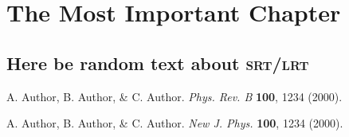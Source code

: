\documentclass[b5paper,twoside,openright]{scrbook}
\begin{document}
\chapter{The Most Important Chapter}
\section{Here be random text about \textsc{srt/lrt}}








\backmatter
\begin{thebibliography}{999}
  A. Author, B. Author, \& C. Author.
  \textit{Phys. Rev. B} \textbf{100}, 1234 (2000).

  A. Author, B. Author, \& C. Author.
  \textit{New J. Phys.} \textbf{100}, 1234 (2000).
\end{thebibliography}
\end{document}
